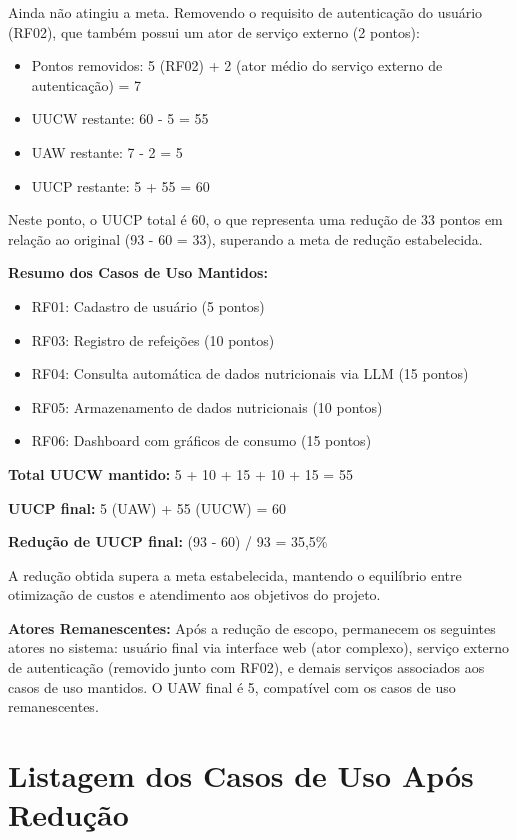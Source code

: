 Ainda não atingiu a meta. Removendo o requisito de autenticação do usuário (RF02), que também possui um ator de serviço externo (2 pontos):

\begin{itemize}
    \item Pontos removidos: 5 (RF02) + 2 (ator médio do serviço externo de autenticação) = 7
    \item UUCW restante: 60 - 5 = 55
    \item UAW restante: 7 - 2 = 5
    \item UUCP restante: 5 + 55 = 60
\end{itemize}

Neste ponto, o UUCP total é 60, o que representa uma redução de 33 pontos em relação ao original (93 - 60 = 33), superando a meta de redução estabelecida.

\textbf{Resumo dos Casos de Uso Mantidos:}

\begin{itemize}
    \item RF01: Cadastro de usuário (5 pontos)
    \item RF03: Registro de refeições (10 pontos)
    \item RF04: Consulta automática de dados nutricionais via LLM (15 pontos)
    \item RF05: Armazenamento de dados nutricionais (10 pontos)
    \item RF06: Dashboard com gráficos de consumo (15 pontos)
\end{itemize}

\textbf{Total UUCW mantido:} 5 + 10 + 15 + 10 + 15 = 55

\textbf{UUCP final:} 5 (UAW) + 55 (UUCW) = 60

\textbf{Redução de UUCP final:} (93 - 60) / 93 = 35,5\%

A redução obtida supera a meta estabelecida, mantendo o equilíbrio entre otimização de custos e atendimento aos objetivos do projeto.

\textbf{Atores Remanescentes:} Após a redução de escopo, permanecem os seguintes atores no sistema: usuário final via interface web (ator complexo), serviço externo de autenticação (removido junto com RF02), e demais serviços associados aos casos de uso mantidos. O UAW final é 5, compatível com os casos de uso remanescentes.

\section{Listagem dos Casos de Uso Após Redução}

